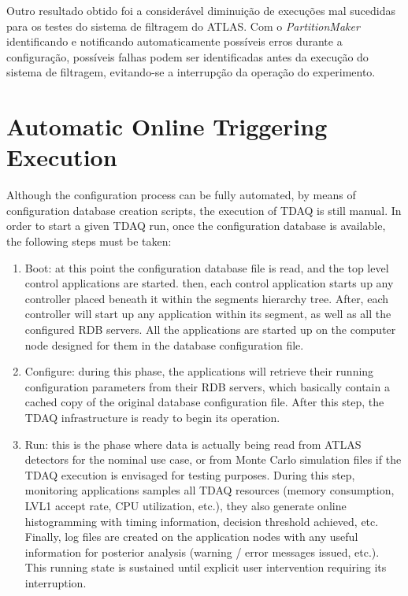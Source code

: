 Outro resultado obtido foi a considerável diminuição de execuções mal sucedidas para os testes do sistema de filtragem do ATLAS. Com o \emph{PartitionMaker} identificando e notificando automaticamente possíveis erros durante a configuração, possíveis falhas podem ser identificadas antes da execução do sistema de filtragem, evitando-se a interrupção da operação do experimento.


\section{Automatic Online Triggering Execution}
\label{sec:runner}

Although the configuration process can be fully automated, by means of configuration database creation scripts, the execution of TDAQ is still manual. In order to start a given TDAQ run, once the configuration database is available, the following steps must be taken:

\begin{enumerate}

\item Boot: at this point the configuration database file is read, and the top level control applications are started. then, each control application starts up any controller placed beneath it within the segments hierarchy tree. After, each controller will start up any application within its segment, as well as all the configured RDB servers. All the applications are started up on the computer node designed for them in the database configuration file.

\item Configure: during this phase, the applications will retrieve their running configuration parameters from their RDB servers, which basically contain a cached copy of the original database configuration file. After this step, the TDAQ infrastructure is ready to begin its operation.

\item Run: this is the phase where data is actually being read from ATLAS detectors for the nominal use case, or from Monte Carlo simulation files if the TDAQ execution is envisaged for testing purposes. During this step, monitoring applications samples all TDAQ resources (memory consumption, LVL1 accept rate, CPU utilization, etc.), they also generate online histogramming with timing information, decision threshold achieved, etc. Finally, log files are created on the application nodes with any useful information for posterior analysis (warning / error messages issued, etc.). This running state is sustained until explicit user intervention requiring its interruption.

\end{enumerate}


